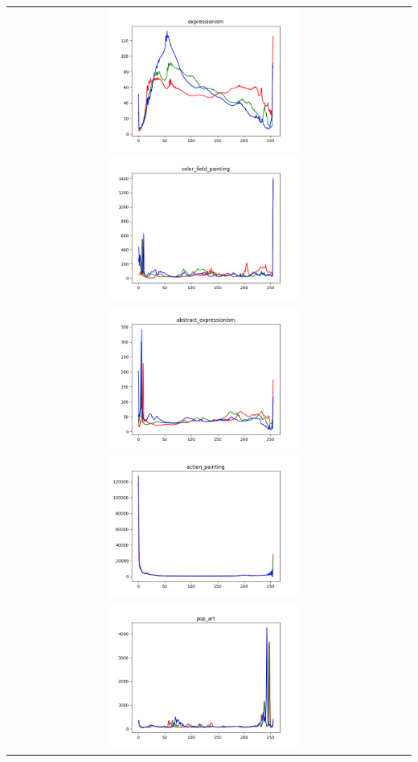 \documentclass{article}
\begin{document}
\begin{center}
\begin{tabular}{cc}
				\noindent
				\includegraphics[width=0.5\textwidth]{plots/expressionism.png}
				\includegraphics[width=0.5\textwidth]{plots/color_field_painting.png}\\[2em]
				\includegraphics[width=0.5\textwidth]{plots/abstract_expressionism.png}
				\includegraphics[width=0.5\textwidth]{plots/action_painting.png}\\[2em]
				\includegraphics[width=0.5\textwidth]{plots/pop_art.png}

\end{tabular}
\end{center}
\end{document}

